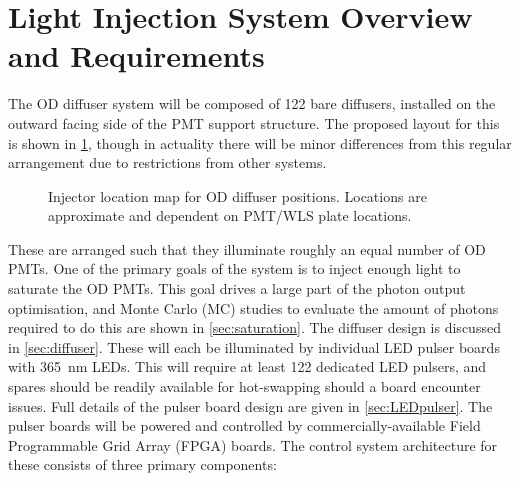 \documentclass[a4paper,11pt]{article}
\begin{document}
\section{Light Injection System Overview and Requirements}\label{sec:overview}

The OD diffuser system will be composed of 122 bare diffusers, installed on the outward facing side of the PMT support structure. The proposed layout for this is shown in \cref{fig:ODdiffmap}, though in actuality there will be minor differences from this regular arrangement due to restrictions from other systems.
\begin{figure}[h!]
\centering
{}
\caption{Injector location map for OD diffuser positions. Locations are approximate and dependent on PMT/WLS plate locations.}\label{fig:ODdiffmap}
\end{figure}
These are arranged such that they illuminate roughly an equal number of OD PMTs. One of the primary goals of the system is to inject enough light to saturate the OD PMTs. This goal drives a large part of the photon output optimisation, and Monte Carlo (MC) studies to evaluate the amount of photons required to do this are shown in \cref{sec:saturation}. The diffuser design is discussed in \cref{sec:diffuser}. These will each be illuminated by individual LED pulser boards with 365~nm LEDs. This will require at least 122 dedicated LED pulsers, and spares should be readily available for hot-swapping should a board encounter issues. Full details of the pulser board design are given in \cref{sec:LEDpulser}. The pulser boards will be powered and controlled by commercially-available Field Programmable Grid Array (FPGA) boards. The control system architecture for these consists of three primary components:
\end{document}
